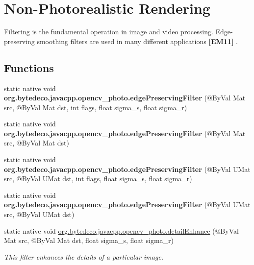 \hypertarget{group__photo__render}{}\section{Non-\/\+Photorealistic Rendering}
\label{group__photo__render}


Filtering is the fundamental operation in image and video processing. Edge-\/preserving smoothing filters are used in many different applications {\bfseries [E\+M11]} .  


\subsection*{Functions}
\begin{DoxyCompactItemize}
\item 
\mbox{\label{group__photo__render_ga33fce11fb461a3ac34deef5040c0acbb}} 
static native void {\bfseries org.\+bytedeco.\+javacpp.\+opencv\+\_\+photo.\+edge\+Preserving\+Filter} (@By\+Val Mat src, @By\+Val Mat dst, int flags, float sigma\+\_\+s, float sigma\+\_\+r)
\item 
\mbox{\label{group__photo__render_gabdae971c961a79e5809e82eff458d164}} 
static native void {\bfseries org.\+bytedeco.\+javacpp.\+opencv\+\_\+photo.\+edge\+Preserving\+Filter} (@By\+Val Mat src, @By\+Val Mat dst)
\item 
\mbox{\label{group__photo__render_ga6492df501861bfa238689abe8ef1e856}} 
static native void {\bfseries org.\+bytedeco.\+javacpp.\+opencv\+\_\+photo.\+edge\+Preserving\+Filter} (@By\+Val U\+Mat src, @By\+Val U\+Mat dst, int flags, float sigma\+\_\+s, float sigma\+\_\+r)
\item 
\mbox{\label{group__photo__render_ga5932b231ba4e335c0bb50123c1c4c162}} 
static native void {\bfseries org.\+bytedeco.\+javacpp.\+opencv\+\_\+photo.\+edge\+Preserving\+Filter} (@By\+Val U\+Mat src, @By\+Val U\+Mat dst)
\item 
static native void \hyperlink{group__photo__render_ga136c4678616b50ca67bb53ea951385fe}{org.\+bytedeco.\+javacpp.\+opencv\+\_\+photo.\+detail\+Enhance} (@By\+Val Mat src, @By\+Val Mat dst, float sigma\+\_\+s, float sigma\+\_\+r)
\begin{DoxyCompactList}\small\item\em This filter enhances the details of a particular image. \end{DoxyCompactList}\item 

\end{DoxyCompactItemize}
